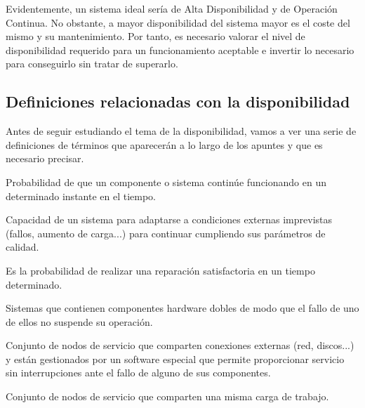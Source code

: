 Evidentemente, un sistema ideal sería de Alta Disponibilidad y de Operación Continua. No obstante, a mayor disponibilidad del sistema mayor es el coste del mismo y su mantenimiento. Por tanto, es necesario valorar el nivel de disponibilidad requerido para un funcionamiento aceptable e invertir lo necesario para conseguirlo sin tratar de superarlo.

\subsection{Definiciones relacionadas con la disponibilidad}

Antes de seguir estudiando el tema de la disponibilidad, vamos a ver una serie de definiciones de términos que aparecerán a lo largo de los apuntes y que es necesario precisar.

\begin{defn}
Probabilidad de que un componente o sistema continúe funcionando en un determinado instante en el tiempo.
\end{defn}

\newpage
\begin{defn}
Capacidad de un sistema para adaptarse a
condiciones externas imprevistas (fallos, aumento de carga...) para continuar cumpliendo sus parámetros de calidad.
\end{defn}

\begin{defn}
Es la probabilidad de realizar una reparación satisfactoria en un tiempo determinado.
\end{defn}

\begin{defn}
Sistemas que contienen
componentes hardware dobles de modo que el fallo de uno de ellos no suspende su
operación.
\end{defn}

\begin{defn}
Conjunto de nodos de servicio que comparten conexiones externas (red, discos...) y están gestionados por un software especial que permite proporcionar servicio sin interrupciones ante el fallo de alguno de sus componentes.
\end{defn}

\begin{defn}
Conjunto de nodos de servicio que comparten una misma carga de trabajo.
\end{defn}

